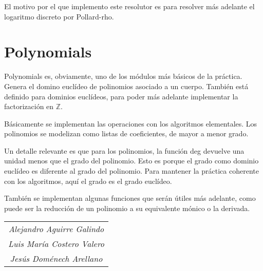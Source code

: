 \documentclass[12pt, a5paper]{article}
\theoremstyle{definition}
\begin{document}
El motivo por el que implemento este resolutor es para resolver más
adelante el logaritmo discreto por Pollard-rho.

\newpage\newpage

\section{Polynomials}
Polynomials es, obviamente, uno de los módulos más básicos de la
práctica. Genera el domino euclídeo de polinomios asociado a un
cuerpo. También está definido para dominios euclídeos, para poder más
adelante implementar la factorización en $\mathbb{Z}$.

Básicamente se implementan las operaciones con los algoritmos
elementales. Los polinomios se modelizan como listas de coeficientes,
de mayor a menor grado. 

Un detalle relevante es que para los polinomios, la función deg
devuelve una unidad menos que el grado del polinomio. Esto es porque
el grado como dominio euclídeo es diferente al grado del polinomio.
Para mantener la práctica coherente con los algoritmos, aquí el grado
es el grado euclídeo.

También se implementan algunas funciones que serán útiles más
adelante, como puede ser la reducción de un polinomio a su equivalente
mónico o la derivada.

\newpage\newpage


\clearpage
\null
{}
\clearpage
\begin{table}
\centering
\begin{tabular}{c}
\emph{Alejandro Aguirre Galindo} \\
\emph{Luis María Costero Valero} \\
\emph{Jesús Doménech Arellano} \\
\end{tabular}
\end{table}
\end{document}
